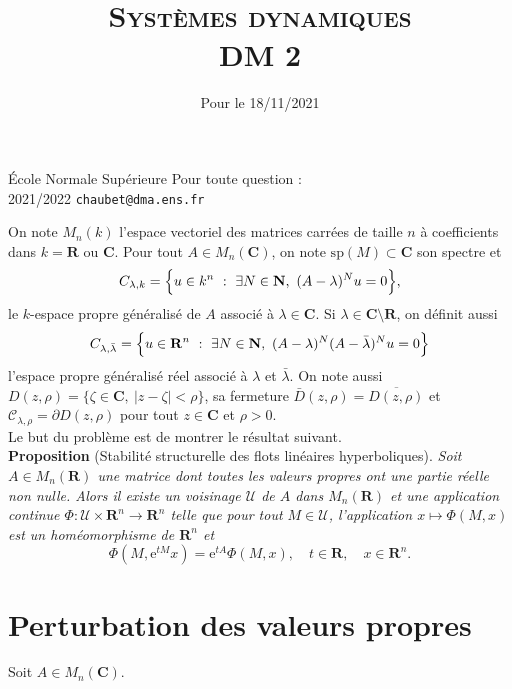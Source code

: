 \documentclass[a4paper,12pt]{article}
\title{\textsc{Syst\`emes dynamiques} \\ DM 2}
\date{{Pour le 18/11/2021}}
\author{}
\theoremstyle{plain}
\theoremstyle{definition}
\newcommand{\e}{\mathrm{e}}
\newcommand{\R}{\mathbf{R}}
\newcommand{\C}{\mathbf{C}}
\newcommand{\N}{\mathbf{N}}
\newcommand{\CC}{\mathscr{C}}
\begin{document}
{\noindent \'Ecole Normale Sup\'erieure  \hfill Pour toute question :} \\
{2021/2022 \hfill  \texttt{chaubet@dma.ens.fr}}

{\let\newpage\relax\maketitle}
\maketitle

\noindent On note $M_n(k)$ l'espace vectoriel des matrices carr\'ees de taille $n$ \`a coefficients dans $k= \R$ ou $\C$. Pour tout $A \in M_n(\C)$, on note $\mathrm{sp}(M) \subset \C$ son spectre et
$$
C_{\lambda, k} = \Bigl\{u \in k^n ~:~\exists N \in \N,~(A-\lambda)^Nu = 0\Bigr\},
$$
le $k$-espace propre g\'en\'eralis\'e de $A$ associ\'e \`a $\lambda \in \C$. Si $\lambda \in \C \setminus \R$, on d\'efinit aussi
$$
C_{\lambda, \bar{\lambda}} = \Bigl\{u \in \R^n~:~ \exists N \in \N,~ (A-\lambda)^N(A-\bar{\lambda})^{N}u = 0 \Bigr\}
$$
l'espace propre g\'en\'eralis\'e r\'eel associ\'e \`a $\lambda$ et $\bar{\lambda}$. On note aussi $D(z, \rho) =  \{\zeta \in \C,~ |z-\zeta| < \rho\}$, sa fermeture $\bar{D}(z,\rho) = \overline{D(z,\rho)}$ et $\CC_{\lambda,\rho} = \partial D(z,\rho)$ pour tout $z \in \C$ et $\rho > 0$. \\

%
\noindent Le but du probl\`eme est de montrer le r\'esultat suivant. \\

\noindent \textbf{Proposition} (Stabilit\'e structurelle des flots lin\'eaires hyperboliques). \textit{Soit $A \in M_n(\R)$ une matrice dont toutes les valeurs propres ont une partie r\'eelle non nulle. Alors il existe un voisinage $\mathcal{U}$ de $A$ dans $M_n(\R)$ et une application continue $\Phi : \mathcal{U} \times \R^n \to \R^n$ telle que pour tout $M \in \mathcal{U}$, l'application $x \mapsto \Phi(M,x)$ est un hom\'eomorphisme de $\R^n$ et
$$
\Phi(M, \e^{tM}x) = \e^{tA}\Phi(M,x), \quad t \in \R, \quad x \in \R^n.
$$
}
\section*{Perturbation des valeurs propres}
Soit $A \in M_n(\C)$.
\end{document}
